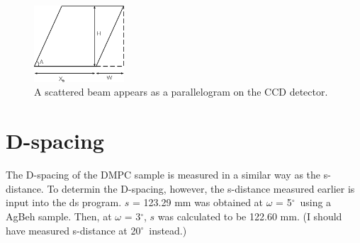 \documentclass[letterpaper,12pt]{article}
\newcommand{\dg}{$^{\circ}$}%
\begin{document}
\begin{figure}[htbp]
	\centering
	\includegraphics[width = 0.3\textwidth]{GeometricBroadening4}
	\caption{A scattered beam appears as a parallelogram on the CCD detector.}
	\label{fig:parallelogram}
\end{figure}
\newpage
\section{D-spacing}
The D-spacing of the DMPC sample is measured in a similar way as the s-distance. To determin the D-spacing, however, the s-distance measured earlier is input into the ds program. $s$ = 123.29 mm was obtained at $\omega$ = 5\dg\ using a AgBeh sample. Then, at $\omega$ = 3\dg, $s$ was calculated to be 122.60 mm. (I should have measured s-distance at 20\dg\ instead.)
\end{document}
